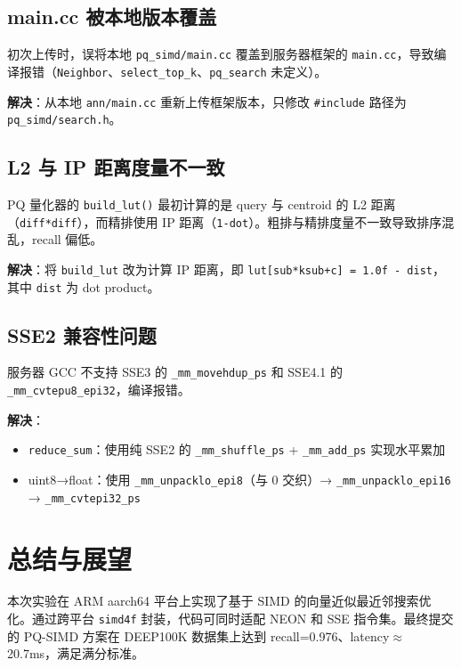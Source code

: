 \documentclass[a4paper]{article}
\begin{document}
\subsection{main.cc 被本地版本覆盖}

初次上传时，误将本地 \texttt{pq\_simd/main.cc} 覆盖到服务器框架的 \texttt{main.cc}，导致编译报错（\texttt{Neighbor}、\texttt{select\_top\_k}、\texttt{pq\_search} 未定义）。

\textbf{解决}：从本地 \texttt{ann/main.cc} 重新上传框架版本，只修改 \texttt{\#include} 路径为 \texttt{pq\_simd/search.h}。

\subsection{L2 与 IP 距离度量不一致}

PQ 量化器的 \texttt{build\_lut()} 最初计算的是 query 与 centroid 的 L2 距离（\texttt{diff*diff}），而精排使用 IP 距离（\texttt{1-dot}）。粗排与精排度量不一致导致排序混乱，recall 偏低。

\textbf{解决}：将 \texttt{build\_lut} 改为计算 IP 距离，即 \texttt{lut[sub*ksub+c] = 1.0f - dist}，其中 \texttt{dist} 为 dot product。

\subsection{SSE2 兼容性问题}

服务器 GCC 不支持 SSE3 的 \texttt{\_mm\_movehdup\_ps} 和 SSE4.1 的 \texttt{\_mm\_cvtepu8\_epi32}，编译报错。

\textbf{解决}：
\begin{itemize}
  \item \texttt{reduce\_sum}：使用纯 SSE2 的 \texttt{\_mm\_shuffle\_ps} + \texttt{\_mm\_add\_ps} 实现水平累加
  \item uint8→float：使用 \texttt{\_mm\_unpacklo\_epi8}（与 0 交织）→ \texttt{\_mm\_unpacklo\_epi16} → \texttt{\_mm\_cvtepi32\_ps}
\end{itemize}

\section{总结与展望}

本次实验在 ARM aarch64 平台上实现了基于 SIMD 的向量近似最近邻搜索优化。通过跨平台 \texttt{simd4f} 封装，代码可同时适配 NEON 和 SSE 指令集。最终提交的 PQ-SIMD 方案在 DEEP100K 数据集上达到 recall=0.976、latency$\approx$20.7ms，满足满分标准。
\end{document}
